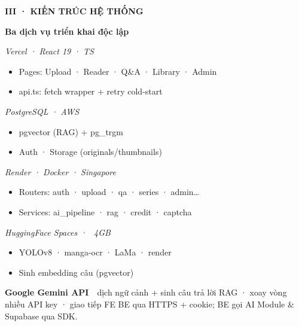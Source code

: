 \documentclass[aspectratio=169,10pt]{beamer}
\newcommand{\kick}[1]{{\headfont\bfseries\footnotesize\textcolor{mred}{\MakeUppercase{#1}}}}
\newcommand{\slidehead}[2]{%
  \kick{#1}\par\vspace{0.6mm}%
  {\headfont\bfseries\LARGE\textcolor{ink}{#2}}\par\vspace{1.2mm}}
\newcommand{\arr}{\textcolor{mred}{\,\raisebox{0.1ex}{$\rightarrow$}\,}}
\begin{document}
\begin{frame}
\slidehead{III · Kiến trúc hệ thống}{Ba dịch vụ triển khai độc lập}
\vspace{0.5mm}
\begin{tcbraster}[raster columns=2, raster equal height=rows, raster column skip=3mm, raster row skip=2mm]
\begin{tcolorbox}[card,colbacktitle=ink,coltitle=white,title={Frontend — Next.js 16}]\footnotesize
\textit{\textcolor{slate}{Vercel · React 19 · TS}}
\begin{itemize}\setlength\itemsep{0.3mm}\item Pages: Upload · Reader · Q\&A · Library · Admin \item api.ts: fetch wrapper + retry cold-start\end{itemize}\end{tcolorbox}
\begin{tcolorbox}[card,colbacktitle=mblue,coltitle=white,title={Supabase}]\footnotesize
\textit{\textcolor{slate}{PostgreSQL · AWS}}
\begin{itemize}\setlength\itemsep{0.3mm}\item pgvector (RAG) + pg\_trgm \item Auth · Storage (originals/thumbnails)\end{itemize}\end{tcolorbox}
\begin{tcolorbox}[card,colbacktitle=mred,coltitle=white,title={Backend API — FastAPI}]\footnotesize
\textit{\textcolor{slate}{Render · Docker · Singapore}}
\begin{itemize}\setlength\itemsep{0.3mm}\item Routers: auth · upload · qa · series · admin… \item Services: ai\_pipeline · rag · credit · captcha\end{itemize}\end{tcolorbox}
\begin{tcolorbox}[card,colbacktitle=mgreen,coltitle=white,title={AI Module — FastAPI}]\footnotesize
\textit{\textcolor{slate}{HuggingFace Spaces · ~4GB}}
\begin{itemize}\setlength\itemsep{0.3mm}\item YOLOv8 · manga-ocr · LaMa · render \item Sinh embedding câu (pgvector)\end{itemize}\end{tcolorbox}
\end{tcbraster}
\vspace{2mm}
\begin{tcolorbox}[creamcard]\footnotesize
{\headfont\bfseries Google Gemini API}\ \ \textcolor{slate}{dịch ngữ cảnh + sinh câu trả lời RAG · xoay vòng nhiều API key · giao tiếp FE\arr BE qua HTTPS + cookie; BE gọi AI Module \& Supabase qua SDK.}
\end{tcolorbox}
\end{frame}
\end{document}
